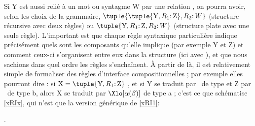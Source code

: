 Si Y est aussi relié à un mot ou syntagme W par une relation , on pourra avoir, selon les choix de la grammaire, $\tuple{\tuple{\text Y,\relstruc1\mathpunct{:}\text Z}, \relstruc2\mathpunct{:}W}$ (structure récursive avec deux règles) ou $\tuple{\text Y,\relstruc1\mathpunct{:}\text Z, \relstruc2\mathpunct{:} W}$ (structure plate avec une seule règle). 
L'important est que chaque règle syntaxique particulière indique précisément quels sont les composants qu'elle implique (par exemple Y et Z) et comment ceux-ci s'organisent entre eux dans la structure (ici avec ), et que nous sachions dans quel ordre les règles s'enchaînent.  
À partir de là, il est relativement simple de formaliser des règles d'interface compositionnelles ; par exemple elles pourront dire : si $\text X = \tuple{\text Y,\relstruc1\mathpunct{:}\text Z}$%
,
et si Y se traduit par \vrb\alpha\ de type  et Z par \vrb\beta\ de type \mtyp b, alors X se traduit par $\Xlo[\alpha(\beta)]$ de type \mtyp a ; c'est ce que schématise \ref{xRIx}, qui n'est que la version générique de \ref{xRI1}: %

\ex. \label{xRIx}



